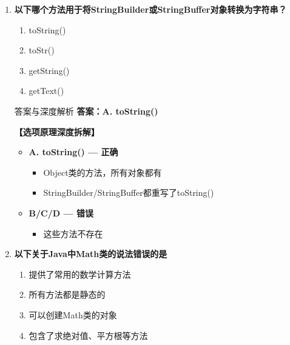 \documentclass[12pt, a4paper]{ctexart}
\begin{document}
\begin{enumerate}[label=\textbf{\arabic*.}]
	      \vspace{1em}

	\item \textbf{以下哪个方法用于将StringBuilder或StringBuffer对象转换为字符串？}
	      \begin{enumerate}[label=\Alph*.]
		      \item toString()
		      \item toStr()
		      \item getString()
		      \item getText()
	      \end{enumerate}

	      \begin{bluebox}{答案与深度解析}
		      \textbf{答案：A. toString()}

		      \textbf{【选项原理深度拆解】}
					  \begin{itemize}[label={}, leftmargin=*, nosep]


		      \item \textbf{A. toString() — 正确}
					  \begin{itemize}[label={}, nosep]
		      
			      \item Object类的方法，所有对象都有
			      \item StringBuilder/StringBuffer都重写了toString()
		      

					  \end{itemize}
		      \item \textbf{B/C/D — 错误}
					  \begin{itemize}[label={}, nosep]
		      
			      \item 这些方法不存在
		      
	      
					  \end{itemize}
					  \end{itemize}
\end{bluebox}

	      \vspace{1em}

	\item \textbf{以下关于Java中Math类的说法错误的是}
	      \begin{enumerate}[label=\Alph*.]
		      \item 提供了常用的数学计算方法
		      \item 所有方法都是静态的
		      \item 可以创建Math类的对象
		      \item 包含了求绝对值、平方根等方法
	      \end{enumerate}


\end{enumerate}
\end{document}
